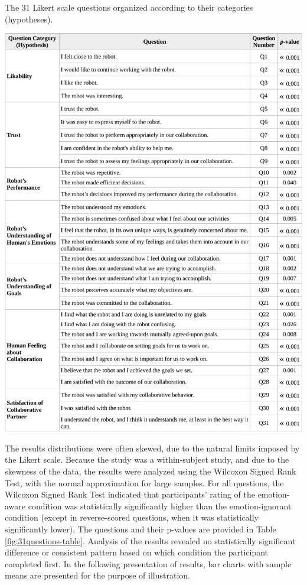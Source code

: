 \documentclass[12pt]{report}
\begin{document}
\begin{table}
 \centering
 \caption{The 31 Likert scale questions organized according to their
 categories (hypotheses).}
 \label{fig:31questions-table}
 \includegraphics[width=1\textwidth]{figure/31questions-table-croped.pdf}
\end{table}
\clearpage

The results distributions were often skewed, due to the natural limits imposed
by the Likert scale. Because the study was a within-subject study, and due to
the skewness of the data, the results were analyzed using the Wilcoxon Signed
Rank Test, with the normal approximation for large samples. For all questions,
the Wilcoxon Signed Rank Test indicated that participants' rating of the
emotion-aware condition was statistically significantly higher than the
emotion-ignorant condition (except in reverse-scored questions, when it was
statistically significantly lower). The questions and their p-values are
provided in Table \ref{fig:31questions-table}. Analysis of the results revealed no statistically
significant difference or consistent pattern based on which condition the
participant completed first. In the following presentation of results, bar
charts with sample means are presented for the purpose of illustration.
\end{document}
